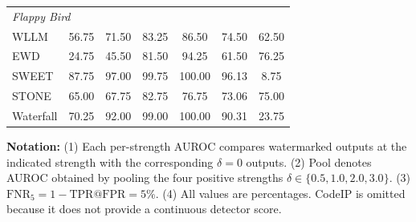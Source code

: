 \begin{table}[!t]
\begin{threeparttable}
\begin{tabular*}{\columnwidth}{@{\extracolsep{\fill}}lcccccc@{}}
\multicolumn{7}{l}{\textit{Flappy Bird}}\\[-1pt]
WLLM      & 56.75 & 71.50 & 83.25 & 86.50 & 74.50 & 62.50 \\
EWD       & 24.75 & 45.50 & 81.50 & 94.25 & 61.50 & 76.25 \\
SWEET     & 87.75 & 97.00 & 99.75 & 100.00 & 96.13 &  8.75 \\
STONE     & 65.00 & 67.75 & 82.75 & 76.75 & 73.06 & 75.00 \\
Waterfall & 70.25 & 92.00 & 99.00 & 100.00 & 90.31 & 23.75 \\
\bottomrule
\end{tabular*}

\begin{tablenotes}[flushleft]
\footnotesize
\item \textbf{Notation:}
(1) Each per-strength AUROC compares watermarked outputs at the indicated
strength with the corresponding $\delta=0$ outputs.
(2) Pool denotes AUROC obtained by pooling the four positive strengths
$\delta\in\{0.5,1.0,2.0,3.0\}$.
(3) $\mathrm{FNR}_{5}=1-\mathrm{TPR@FPR{=}5\%}$.
(4) All values are percentages. CodeIP is omitted because it does not
provide a continuous detector score.
\end{tablenotes}

\end{threeparttable}
\end{table}
